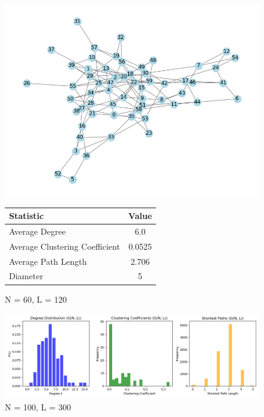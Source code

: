 \documentclass[10pt,letterpaper, onecolumn]{report}
\begin{document}
\begin{flushleft}
    \begin{figure}[htbp!]
        \centering
        \begin{minipage}{0.5\textwidth} %
            \centering
            \includegraphics[width=\textwidth]{../erdos_renyi_NL.png} %
            \caption{N = 60, L = 120}
            \label{fig:erdos_renyi_NL}
        \end{minipage}%
        \begin{minipage}{0.5\textwidth} %
            \centering
            \begin{tabular}{|l|c|}
                \hline
                \textbf{Statistic} & \textbf{Value} \\
                \hline
                Average Degree & 6.0 \\
                Average Clustering Coefficient & 0.0525 \\
                Average Path Length & 2.706 \\
                Diameter & 5 \\
                \hline
            \end{tabular}
            \label{tab:erdos_renyi_NL_stats}
        \end{minipage}
    \end{figure}

    \begin{figure}[htbp!] %
        \centering
        \includegraphics[width=1\textwidth]{../G(N, L)_Graph with 100 nodes and 300 edges.png} %
        \caption{N = 100, L = 300} %
    \end{figure}
    


\end{flushleft}
\end{document}
